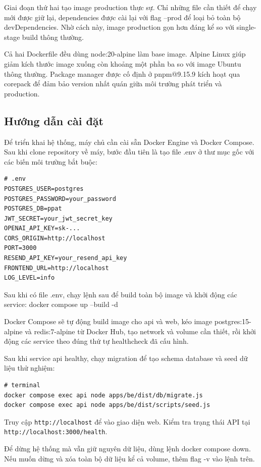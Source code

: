 \documentclass[../main.tex]{subfiles}
\begin{document}
Giai đoạn thứ hai tạo image production thực sự. Chỉ những file cần thiết để chạy mới được giữ lại, dependencies được cài lại với flag --prod để loại bỏ toàn bộ devDependencies. Nhờ cách này, image production gọn hơn đáng kể so với single-stage build thông thường.

Cả hai Dockerfile đều dùng node:20-alpine làm base image. Alpine Linux giúp giảm kích thước image xuống còn khoảng một phần ba so với image Ubuntu thông thường. Package manager được cố định ở pnpm@9.15.9 kích hoạt qua corepack để đảm bảo version nhất quán giữa môi trường phát triển và production.

\subsection{Hướng dẫn cài đặt}

Để triển khai hệ thống, máy chủ cần cài sẵn Docker Engine và Docker Compose. Sau khi clone repository về máy, bước đầu tiên là tạo file .env ở thư mục gốc với các biến môi trường bắt buộc:

\begin{Verbatim}
# .env
POSTGRES_USER=postgres
POSTGRES_PASSWORD=your_password
POSTGRES_DB=ppat
JWT_SECRET=your_jwt_secret_key
OPENAI_API_KEY=sk-...
CORS_ORIGIN=http://localhost
PORT=3000
RESEND_API_KEY=your_resend_api_key
FRONTEND_URL=http://localhost
LOG_LEVEL=info
\end{Verbatim}

Sau khi có file .env, chạy lệnh sau để build toàn bộ image và khởi động các service: docker compose up --build -d

Docker Compose sẽ tự động build image cho api và web, kéo image postgres:15-alpine và redis:7-alpine từ Docker Hub, tạo network và volume cần thiết, rồi khởi động các service theo đúng thứ tự healthcheck đã cấu hình.

Sau khi service api healthy, chạy migration để tạo schema database và seed dữ liệu thử nghiệm:

\begin{Verbatim}
# terminal
docker compose exec api node apps/be/dist/db/migrate.js
docker compose exec api node apps/be/dist/scripts/seed.js
\end{Verbatim}

Truy cập \texttt{http://localhost} để vào giao diện web. Kiểm tra trạng thái API tại \texttt{http://localhost:3000/health}.

Để dừng hệ thống mà vẫn giữ nguyên dữ liệu, dùng lệnh docker compose down. Nếu muốn dừng và xóa toàn bộ dữ liệu kể cả volume, thêm flag -v vào lệnh trên.
\end{document}
